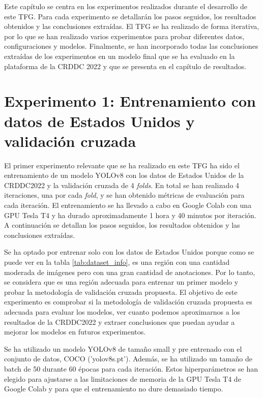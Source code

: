 
Este capítulo se centra en los experimentos realizados durante el desarrollo de este TFG. Para cada experimento se detallarán los pasos seguidos, los resultados obtenidos y las conclusiones extraídas. El TFG se ha realizado de forma iterativa, por lo que se han realizado varios experimentos para probar diferentes datos, configuraciones y modelos. Finalmente, se han incorporado todas las conclusiones extraídas de los experimentos en un modelo final que se ha evaluado en la plataforma de la CRDDC 2022 y que se presenta en el capítulo de resultados.


\section{Experimento 1: Entrenamiento con datos de Estados Unidos y validación cruzada}

El primer experimento relevante que se ha realizado en este TFG ha sido el entrenamiento de un modelo YOLOv8 con los datos de Estados Unidos de la CRDDC2022 y la validación cruzada de 4 \textit{folds}. En total se han realizado 4 iteraciones, una por cada \textit{fold}, y se han obtenido métricas de evaluación para cada iteración. El entrenamiento se ha llevado a cabo en Google Colab con una GPU Tesla T4 y ha durado aproximadamente 1 hora y 40 minutos por iteración. A continuación se detallan los pasos seguidos, los resultados obtenidos y las conclusiones extraídas.

Se ha optado por entrenar solo con los datos de Estados Unidos porque como se puede ver en la tabla \ref{tab:dataset_info}, es una región con una cantidad moderada de imágenes pero con una gran cantidad de anotaciones. Por lo tanto, se considera que es una región adecuada para entrenar un primer modelo y probar la metodología de validación cruzada propuesta. El objetivo de este experimento es comprobar si la metodología de validación cruzada propuesta es adecuada para evaluar los modelos, ver cuanto podemos aproximarnos a los resultados de la CRDDC2022 y extraer conclusiones que puedan ayudar a mejorar los modelos en futuros experimentos.

Se ha utilizado un modelo YOLOv8 de tamaño small y pre entrenado con el conjunto de datos, COCO ('yolov8s.pt'). Además, se ha utilizado un tamaño de batch de 50 durante 60 épocas para cada iteración. Estos hiperparámetros se han elegido para ajustarse a las limitaciones de memoria de la GPU Tesla T4 de Google Colab y para que el entrenamiento no dure demasiado tiempo.

